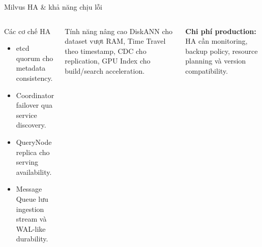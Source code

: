 \begin{frame}{Milvus HA \& khả năng chịu lỗi}
	\begin{columns}
		\begin{block}{Các cơ chế HA}
			\begin{itemize}
				\item etcd quorum cho metadata consistency.
				\item Coordinator failover qua service discovery.
				\item QueryNode replica cho serving availability.
				\item Message Queue lưu ingestion stream và WAL-like durability.
			\end{itemize}
		\end{block}
		\begin{exampleblock}{Tính năng nâng cao}
			DiskANN cho dataset vượt RAM, Time Travel theo timestamp, CDC cho replication, GPU Index cho build/search acceleration.
		\end{exampleblock}
		\vspace{0.15cm}
		\textbf{Chi phí production:} HA cần monitoring, backup policy, resource planning và version compatibility.
	\end{columns}
\end{frame}
